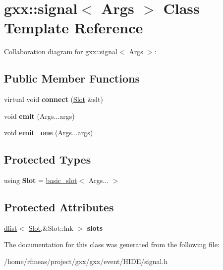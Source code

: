 \hypertarget{classgxx_1_1signal}{}\section{gxx\+:\+:signal$<$ Args $>$ Class Template Reference}
\label{classgxx_1_1signal}


Collaboration diagram for gxx\+:\+:signal$<$ Args $>$\+:
\subsection*{Public Member Functions}
\begin{DoxyCompactItemize}
\item 
virtual void {\bfseries connect} (\hyperlink{classgxx_1_1basic__slot}{Slot} \&slt)\hypertarget{classgxx_1_1signal_af0aa2418e88b23f1204ac941e75f242f}{}\label{classgxx_1_1signal_af0aa2418e88b23f1204ac941e75f242f}

\item 
void {\bfseries emit} (Args...\+args)\hypertarget{classgxx_1_1signal_acfe2da1719a4789f8a1a2ccad7722907}{}\label{classgxx_1_1signal_acfe2da1719a4789f8a1a2ccad7722907}

\item 
void {\bfseries emit\+\_\+one} (Args...\+args)\hypertarget{classgxx_1_1signal_ad12d75e0caa0e21834f9264c6633eb4d}{}\label{classgxx_1_1signal_ad12d75e0caa0e21834f9264c6633eb4d}

\end{DoxyCompactItemize}
\subsection*{Protected Types}
\begin{DoxyCompactItemize}
\item 
using {\bfseries Slot} = \hyperlink{classgxx_1_1basic__slot}{basic\+\_\+slot}$<$ Args... $>$\hypertarget{classgxx_1_1signal_a49f1611eff96431ec4396ebd39e719e2}{}\label{classgxx_1_1signal_a49f1611eff96431ec4396ebd39e719e2}

\end{DoxyCompactItemize}
\subsection*{Protected Attributes}
\begin{DoxyCompactItemize}
\item 
\hyperlink{classgxx_1_1dlist}{dlist}$<$ \hyperlink{classgxx_1_1basic__slot}{Slot},\&Slot\+::lnk $>$ {\bfseries slots}\hypertarget{classgxx_1_1signal_a240b508d3361e4222573ca016c81fd14}{}\label{classgxx_1_1signal_a240b508d3361e4222573ca016c81fd14}

\end{DoxyCompactItemize}


The documentation for this class was generated from the following file\+:\begin{DoxyCompactItemize}
\item 
/home/rfmeas/project/gxx/gxx/event/\+H\+I\+D\+E/signal.\+h\end{DoxyCompactItemize}
